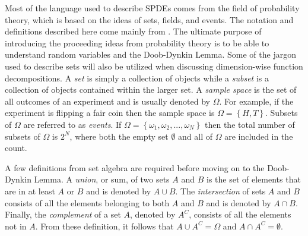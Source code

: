 Most of the language used to describe \ac{SPDE}s comes from the field of probability theory, which is based on the ideas of sets, fields, and events. The notation and definitions described here come mainly from \cite{PrbThryPrlms}. The ultimate purpose of introducing the proceeding ideas from probability theory is to be able to understand random variables and the Doob-Dynkin Lemma. Some of the jargon used to describe sets will also be utilized when discussing dimension-wise function decompositions. A \textit{set} is simply a collection of objects while a \textit{subset} is a collection of objects contained within the larger set. A \textit{sample space} is the set of all outcomes of an experiment and is usually denoted by $\Omega$. For example, if the experiment is flipping a fair coin then the sample space is $\Omega = \left\lbrace	H,T\right\rbrace$. Subsets of $\Omega$ are referred to as \textit{events}. If $\Omega = \left\lbrace\omega_1, \omega_2, ..., \omega_N\right\rbrace$ then the total number of subsets of $\Omega$ is $2^N$, where both the empty set $\emptyset$ and all of $\Omega$ are included in the count.

A few definitions from set algebra are required before moving on to the Doob-Dynkin Lemma. A \textit{union}, or sum, of two sets $A$ and $B$ is the set of elements that are in at least $A$ or $B$ and is denoted by $A\cup B$. The \textit{intersection} of sets $A$ and $B$ consists of all the elements belonging to both $A$ and $B$ and is denoted by $A\cap B$. Finally, the \textit{complement} of a set $A$, denoted by $A^C$, consists of all the elements not in $A$. From these definition, it follows that $A\cup A^C = \Omega$ and $A\cap A^C = \emptyset$.

